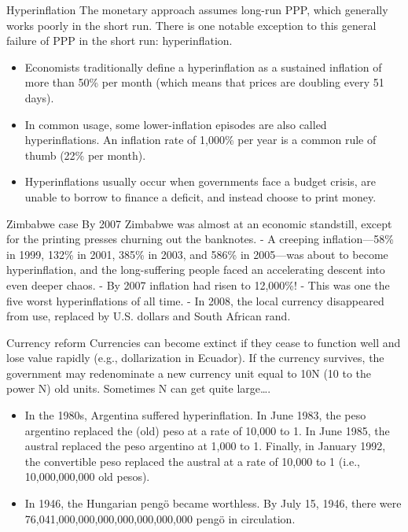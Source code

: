 \documentclass[
  ignorenonframetext,
]{beamer}
\providecommand{\tightlist}{%
  \setlength{\itemsep}{0pt}\setlength{\parskip}{0pt}}\usepackage{longtable,booktabs,array}
\begin{document}
\begin{frame}{Hyperinflation}
\label{hyperinflation}
The monetary approach assumes long-run PPP, which generally works poorly
in the short run. There is one notable exception to this general failure
of PPP in the short run: hyperinflation.

\begin{itemize}
\item
  Economists traditionally define a hyperinflation as a sustained
  inflation of more than 50\% per month (which means that prices are
  doubling every 51 days).
\item
  In common usage, some lower-inflation episodes are also called
  hyperinflations. An inflation rate of 1,000\% per year is a common
  rule of thumb (22\% per month).
\item
  Hyperinflations usually occur when governments face a budget crisis,
  are unable to borrow to finance a deficit, and instead choose to print
  money.
\end{itemize}
\end{frame}

\begin{frame}{Zimbabwe case}
\label{zimbabwe-case}
By 2007 Zimbabwe was almost at an economic standstill, except for the
printing presses churning out the banknotes. - A creeping
inflation---58\% in 1999, 132\% in 2001, 385\% in 2003, and 586\% in
2005---was about to become hyperinflation, and the long-suffering people
faced an accelerating descent into even deeper chaos. - By 2007
inflation had risen to 12,000\%! - This was one the five worst
hyperinflations of all time. - In 2008, the local currency disappeared
from use, replaced by U.S. dollars and South African rand.
\end{frame}

\begin{frame}[s]{Currency reform}
\label{currency-reform}
Currencies can become extinct if they cease to function well and lose
value rapidly (e.g., dollarization in Ecuador). If the currency
survives, the government may redenominate a new currency unit equal to
10N (10 to the power N) old units. Sometimes N can get quite
large\ldots.

\begin{itemize}
\tightlist
\item
  In the 1980s, Argentina suffered hyperinflation. In June 1983, the
  peso argentino replaced the (old) peso at a rate of 10,000 to 1. In
  June 1985, the austral replaced the peso argentino at 1,000 to 1.
  Finally, in January 1992, the convertible peso replaced the austral at
  a rate of 10,000 to 1 (i.e., 10,000,000,000 old pesos).
\item
  In 1946, the Hungarian pengö became worthless. By July 15, 1946, there
  were 76,041,000,000,000,000,000,000,000 pengö in circulation.
\end{itemize}
\end{frame}
\end{document}
